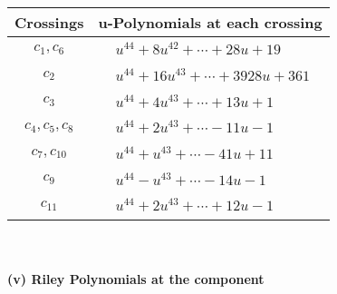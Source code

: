 \documentclass[1p]{elsarticle_modified}
\theoremstyle{definition}
\begin{document}
\begin{tabular}{m{50pt}|m{274pt}}
Crossings & \hspace{64pt}u-Polynomials at each crossing \\
\hline $$\begin{aligned}c_{1},c_{6}\end{aligned}$$&$\begin{aligned}
&u^{44}+8 u^{42}+\cdots+28 u+19
\end{aligned}$\\
\hline $$\begin{aligned}c_{2}\end{aligned}$$&$\begin{aligned}
&u^{44}+16 u^{43}+\cdots+3928 u+361
\end{aligned}$\\
\hline $$\begin{aligned}c_{3}\end{aligned}$$&$\begin{aligned}
&u^{44}+4 u^{43}+\cdots+13 u+1
\end{aligned}$\\
\hline $$\begin{aligned}c_{4},c_{5},c_{8}\end{aligned}$$&$\begin{aligned}
&u^{44}+2 u^{43}+\cdots-11 u-1
\end{aligned}$\\
\hline $$\begin{aligned}c_{7},c_{10}\end{aligned}$$&$\begin{aligned}
&u^{44}+u^{43}+\cdots-41 u+11
\end{aligned}$\\
\hline $$\begin{aligned}c_{9}\end{aligned}$$&$\begin{aligned}
&u^{44}- u^{43}+\cdots-14 u-1
\end{aligned}$\\
\hline $$\begin{aligned}c_{11}\end{aligned}$$&$\begin{aligned}
&u^{44}+2 u^{43}+\cdots+12 u-1
\end{aligned}$\\
\hline
\end{tabular}\\~\\
\newpage\renewcommand{\arraystretch}{1}
\flushleft \textbf{(v) Riley Polynomials at the component}\newline \\
\end{document}
